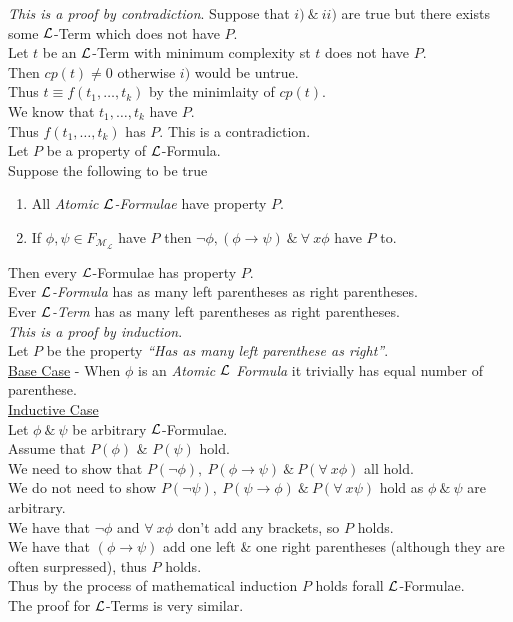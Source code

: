 \documentclass[11pt,a4paper]{article}
\begin{document}
\textit{This is a proof by contradiction}.
Suppose that $i)\ \&\ ii)$ are true but there exists some $\mathcal{L}$-Term which does not have $P$.\\
Let $t$ be an $\mathcal{L}$-Term with minimum complexity st $t$ does not have $P$.\\
Then $cp(t)\neq0$ otherwise $i)$ would be untrue.\\
Thus $t\equiv f(t_1,\dots,t_k)$ by the minimlaity of $cp(t)$.\\
We know that $t_1,\dots,t_k$ have $P$.\\
Thus $f(t_1,\dots,t_k)$ has $P$. This is a contradiction.\\

Let $P$ be a property of $\mathcal{L}$-Formula.\\
Suppose the following to be true
\begin{enumerate}
	\item All \textit{Atomic $\mathcal{L}$-Formulae} have property $P$.
	\item If $\phi,\psi\in F_\mathcal{M_L}$ have $P$ then $\neg\phi,(\phi\to\psi)\ \&\ \forall\ x\phi$ have $P$ to.
\end{enumerate}
Then every $\mathcal{L}$-Formulae has property $P$.\\

Ever \textit{$\mathcal{L}$-Formula} has as many left parentheses as right parentheses.\\
Ever \textit{$\mathcal{L}$-Term} has as many left parentheses as right parentheses.\\

\textit{This is a proof by induction}.\\
Let $P$ be the property \textit{``Has as many left parenthese as right''}.\\
\underline{Base Case} - When $\phi$ is an \textit{Atomic $\mathcal{L}$ Formula} it trivially has equal number of parenthese.\\
\underline{Inductive Case}\\
Let $\phi\ \&\ \psi$ be arbitrary $\mathcal{L}$-Formulae.\\
Assume that $P(\phi)$ \& $P(\psi)$ hold.\\
We need to show that $P(\neg\phi),\ P(\phi\to\psi)\ \&\ P(\forall\ x\phi)$ all hold.\\
We do not need to show $P(\neg\psi),\ P(\psi\to\phi)\ \&\ P(\forall\ x\psi)$ hold as $\phi\ \&\ \psi$ are arbitrary.\\
We have that $\neg\phi$ and $\forall\ x\phi$ don't add any brackets, so $P$ holds.\\
We have that $(\phi\to\psi)$ add one left \& one right parentheses (although they are often surpressed), thus $P$ holds.\\
Thus by the process of mathematical induction $P$ holds forall $\mathcal{L}$-Formulae.\\
\nb The proof for $\mathcal{L}$-Terms is very similar.
\end{document}
